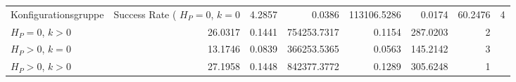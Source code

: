 \begin{tabular}{lrrrrrr}
\toprule
Konfigurationsgruppe & Success Rate (%
\midrule
$H_P=0$, $k=0$ & 4.2857 & 0.0386 & 113106.5286 & 0.0174 & 60.2476 & 4 \\
$H_P=0$, $k>0$ & 26.0317 & 0.1441 & 754253.7317 & 0.1154 & 287.0203 & 2 \\
$H_P>0$, $k=0$ & 13.1746 & 0.0839 & 366253.5365 & 0.0563 & 145.2142 & 3 \\
$H_P>0$, $k>0$ & 27.1958 & 0.1448 & 842377.3772 & 0.1289 & 305.6248 & 1 \\
\bottomrule
\end{tabular}
